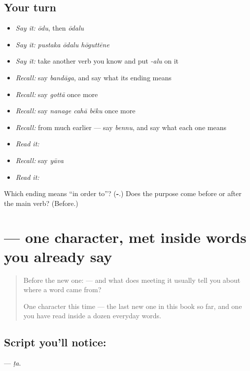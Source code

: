 \subsection*{Your turn}
\begin{itemize}
\raggedright
  \item \emph{Say it:} \emph{ōdu}, then \emph{ōdalu}
  \item \emph{Say it:} \emph{pustaka ōdalu hōguttēne}
  \item \emph{Say it:} take another verb you know and put \emph{-alu} on it
  \item \emph{Recall:} say \emph{bandāga}, and say what its ending means
  \item \emph{Recall:} say \emph{gottā} once more
  \item \emph{Recall:} say \emph{nanage cahā bēku} once more
  \item \emph{Recall:} from much earlier — say \emph{bennu}, and say what each one means
  \item \emph{Read it:} \textbf{}
  \item \emph{Recall:} say \emph{yāva}
  \item \emph{Read it:} \textbf{}
\end{itemize}

\begin{tcolorbox}[breakable,colback=teal!4,colframe=teal!35!black,title={Before you move on}]
Which ending means \textquotedblleft{}in order to\textquotedblright{}? (\textbf{-}.) Does the purpose come before or after the main verb? (Before.)
\end{tcolorbox}
\section[\texorpdfstring{\kn{ಟ} (ṭa)}{ಟ (ṭa)}]{ — one character, met inside words you already say}

\label{lesson:KA-S151-letter-tta}



\begin{quote}
Before the new one:  — and what does meeting it usually tell you about where a word came from?

One character this time — the last new one in this book so far, and one you have read inside a dozen everyday words.
\end{quote}

\subsection*{Script you'll notice: }
\textbf{} — \emph{ṭa}.


